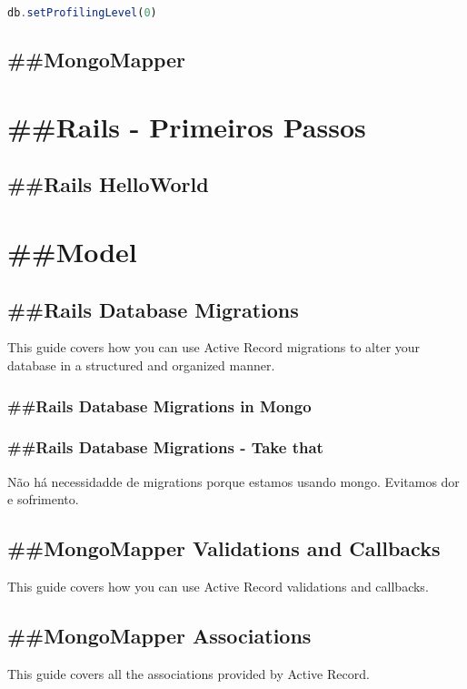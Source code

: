 \documentclass[serif,mathserif]{article}
\begin{document}
\begin{lstlisting}[language=Javascript]
db.setProfilingLevel(0)
\end{lstlisting}



\subsection{\#\#MongoMapper}



\section{\#\#Rails - Primeiros Passos}

\subsection{\#\#Rails HelloWorld}

\section{\#\#Model}

\subsection{\#\#Rails Database Migrations}
This guide covers how you can use Active Record migrations to alter your database in a structured and organized manner.

\subsubsection{\#\#Rails Database Migrations in Mongo}

\subsubsection{\#\#Rails Database Migrations - Take that}
Não há necessidadde de migrations porque estamos usando mongo.
Evitamos dor e sofrimento.

\subsection{\#\#MongoMapper Validations and Callbacks}
This guide covers how you can use Active Record validations and callbacks.

\subsection{\#\#MongoMapper Associations}
This guide covers all the associations provided by Active Record.
\end{document}

